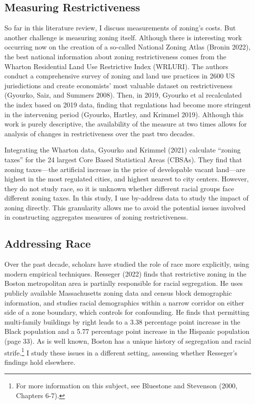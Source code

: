 \documentclass[11pt]{article}
\begin{document}
\subsection{Measuring Restrictiveness}

So far in this literature review, I discuss measurements of zoning’s costs. But another challenge is measuring zoning itself. Although there is interesting work occurring now on the creation of a so-called National Zoning Atlas (Bronin 2022), the best national information about zoning restrictiveness comes from the Wharton Residential Land Use Restrictive Index (WRLURI). The authors conduct a comprehensive survey of zoning and land use practices in 2600 US jurisdictions and create economists’ most valuable dataset on restrictiveness (Gyourko, Saiz, and Summers 2008). Then, in 2019, Gyourko et al recalculated the index based on 2019 data, finding that regulations had become more stringent in the intervening period (Gyourko, Hartley, and Krimmel 2019). Although this work is purely descriptive, the availability of the measure at two times allows for analysis of changes in restrictiveness over the past two decades.

Integrating the Wharton data, Gyourko and Krimmel (2021) calculate “zoning taxes” for the 24 largest Core Based Statistical Areas (CBSAs). They find that zoning taxes---the artificial increase in the price of developable vacant land---are highest in the most regulated cities, and highest nearest to city centers. However, they do not study race, so it is unknown whether different racial groups face different zoning taxes. In this study, I use by-address data to study the impact of zoning directly. This granularity allows me to avoid the potential issues involved in constructing aggregates measures of zoning restrictiveness.

\subsection{Addressing Race}

Over the past decade, scholars have studied the role of race more explicitly, using modern empirical techniques. Resseger (2022) finds that restrictive zoning in the Boston metropolitan area is partially responsible for racial segregation. He uses publicly available Massachusetts zoning data and census block demographic information, and studies racial demographics within a narrow corridor on either side of a zone boundary, which controls for confounding. He finds that permitting multi-family buildings by right leads to a 3.38 percentage point increase in the Black population and a 5.77 percentage point increase in the Hispanic population (page 33). As is well known, Boston has a unique history of segregation and racial strife.\footnote{For more information on this subject, see Bluestone and Stevenson (2000, Chapters 6-7).} I study these issues in a different setting, assessing whether Resseger’s findings hold elsewhere.
\end{document}

